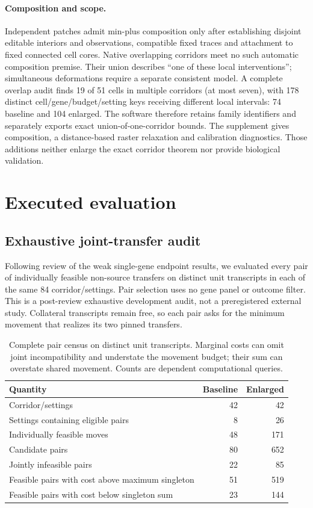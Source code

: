 \documentclass[10pt,letterpaper]{article}
\begin{document}
\paragraph{Composition and scope.}
Independent patches admit min-plus composition only after establishing disjoint editable interiors and observations, compatible fixed traces and attachment to fixed connected cell cores. Native overlapping corridors meet no such automatic composition premise. Their union describes ``one of these local interventions''; simultaneous deformations require a separate consistent model. A complete overlap audit finds 19 of 51 cells in multiple corridors (at most seven), with 178 distinct cell/gene/budget/setting keys receiving different local intervals: 74 baseline and 104 enlarged. The software therefore retains family identifiers and separately exports exact union-of-one-corridor bounds. The supplement gives composition, a distance-based raster relaxation and calibration diagnostics. Those additions neither enlarge the exact corridor theorem nor provide biological validation.

\section{Executed evaluation}
\subsection{Exhaustive joint-transfer audit}
Following review of the weak single-gene endpoint results, we evaluated every pair of individually feasible non-source transfers on distinct unit transcripts in each of the same 84 corridor/settings. Pair selection uses no gene panel or outcome filter. This is a post-review exhaustive development audit, not a preregistered external study. Collateral transcripts remain free, so each pair asks for the minimum movement that realizes its two pinned transfers.

\begin{table}[!ht]\centering
\begin{tabular}{lrr}\toprule
Quantity & Baseline & Enlarged\\\midrule
Corridor/settings &42&42\\
Settings containing eligible pairs &8&26\\
Individually feasible moves &48&171\\
Candidate pairs &80&652\\
Jointly infeasible pairs &22&85\\
Feasible pairs with cost above maximum singleton &51&519\\
Feasible pairs with cost below singleton sum &23&144\\\bottomrule
\end{tabular}
\caption{Complete pair census on distinct unit transcripts. Marginal costs can omit joint incompatibility and understate the movement budget; their sum can overstate shared movement. Counts are dependent computational queries.}\label{tab:pairs}
\end{table}
\end{document}
